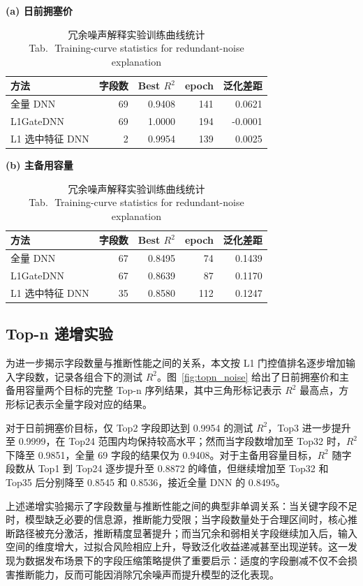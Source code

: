 \documentclass[UTF8,zihao=5,twoside]{ctexart}
\numberwithin{equation}{section}
\newcommand{\tabbicaption}[2]{%
  \caption{#1\\[-0.2em]\small Tab.\,\thetable\ #2}
}
\begin{document}
\begin{table}[!tbp]
\centering
\scriptsize
\setlength{\tabcolsep}{3pt}
\tabbicaption{冗余噪声解释实验训练曲线统计}{Training-curve statistics for redundant-noise explanation}
\label{tab:noise_curve}
\textbf{(a) 日前拥塞价}\\[-0.2em]
\begin{tabularx}{\columnwidth}{Xrrrr}
\toprule
方法 & 字段数 & Best $R^2$ & epoch & 泛化差距 \\
\midrule
全量 DNN & 69 & 0.9408 & 141 & 0.0621 \\
L1GateDNN & 69 & 1.0000 & 194 & -0.0001 \\
L1 选中特征 DNN & 2 & 0.9954 & 139 & 0.0025 \\
\bottomrule
\end{tabularx}

\vspace{0.4em}
\textbf{(b) 主备用容量}\\[-0.2em]
\begin{tabularx}{\columnwidth}{Xrrrr}
\toprule
方法 & 字段数 & Best $R^2$ & epoch & 泛化差距 \\
\midrule
全量 DNN & 67 & 0.8495 & 74 & 0.1439 \\
L1GateDNN & 67 & 0.8639 & 87 & 0.1170 \\
L1 选中特征 DNN & 35 & 0.8580 & 112 & 0.1247 \\
\bottomrule
\end{tabularx}
\end{table}

\subsection{Top-n 递增实验}
为进一步揭示字段数量与推断性能之间的关系，本文按 L1 门控值排名逐步增加输入字段数，记录各组合下的测试 $R^2$。图~\ref{fig:topn_noise} 给出了日前拥塞价和主备用容量两个目标的完整 Top-n 序列结果，其中三角形标记表示 $R^2$ 最高点，方形标记表示全量字段对应的结果。

对于日前拥塞价目标，仅 Top2 字段即达到 0.9954 的测试 $R^2$，Top3 进一步提升至 0.9999，在 Top24 范围内均保持较高水平；然而当字段数增加至 Top32 时，$R^2$ 下降至 0.9851，全量 69 字段的结果仅为 0.9408。对于主备用容量目标，$R^2$ 随字段数从 Top1 到 Top24 逐步提升至 0.8872 的峰值，但继续增加至 Top32 和 Top35 后分别降至 0.8545 和 0.8536，接近全量 DNN 的 0.8495。

上述递增实验揭示了字段数量与推断性能之间的典型非单调关系：当关键字段不足时，模型缺乏必要的信息源，推断能力受限；当字段数量处于合理区间时，核心推断路径被充分激活，推断精度显著提升；而当冗余和弱相关字段继续加入后，输入空间的维度增大，过拟合风险相应上升，导致泛化收益递减甚至出现逆转。这一发现为数据发布场景下的字段压缩策略提供了重要启示：适度的字段删减不仅不会损害推断能力，反而可能因消除冗余噪声而提升模型的泛化表现。
\end{document}
